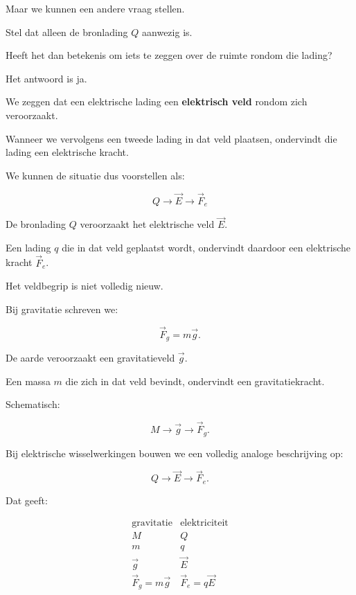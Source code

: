 \documentclass{ximera}
\begin{document}
Maar we kunnen een andere vraag stellen.

Stel dat alleen de bronlading $Q$ aanwezig is.

Heeft het dan betekenis om iets te zeggen over de ruimte rondom die
lading?

Het antwoord is ja.

We zeggen dat een elektrische lading een
\textbf{elektrisch veld} rondom zich veroorzaakt.

Wanneer we vervolgens een tweede lading in dat veld plaatsen,
ondervindt die lading een elektrische kracht.

We kunnen de situatie dus voorstellen als:

\[
\boxed{
Q
\longrightarrow
\vec E
\longrightarrow
\vec F_e
}
\]

De bronlading $Q$ veroorzaakt het elektrische veld $\vec E$.

Een lading $q$ die in dat veld geplaatst wordt, ondervindt daardoor
een elektrische kracht $\vec F_e$.




Het veldbegrip is niet volledig nieuw.

Bij gravitatie schreven we:

\[
\boxed{
\vec F_g=m\vec g.
}
\]

De aarde veroorzaakt een gravitatieveld $\vec g$.

Een massa $m$ die zich in dat veld bevindt, ondervindt een
gravitatiekracht.

Schematisch:

\[
M
\longrightarrow
\vec g
\longrightarrow
\vec F_g.
\]

Bij elektrische wisselwerkingen bouwen we een volledig analoge
beschrijving op:

\[
Q
\longrightarrow
\vec E
\longrightarrow
\vec F_e.
\]

Dat geeft:

\[
\boxed{
\begin{array}{c|c}
\text{gravitatie} & \text{elektriciteit}\\
\hline
M & Q\\
m & q\\
\vec g & \vec E\\
\vec F_g=m\vec g & \vec F_e=q\vec E
\end{array}
}
\]
\end{document}
